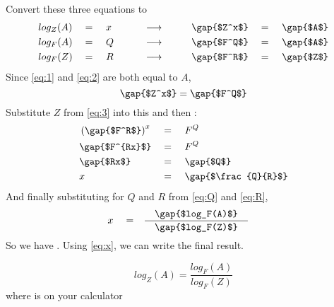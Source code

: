 \begin{NoHyper}
Convert these three equations to  
\begin{alignat}{7}
    & log_Z(A) && = &\,\,& x &\qquad& \longrightarrow &\qquad& \text{\gap{$Z^x$}} && = &\,\,& \text{\gap{$A$}} \label{eq:1}\\
    & log_F(A) && = && Q     &\qquad& \longrightarrow &\qquad& \text{\gap{$F^Q$}} && = &&     \text{\gap{$A$}} \label{eq:2}\\
    & log_F(Z) && = && R     &\qquad& \longrightarrow &\qquad& \text{\gap{$F^R$}} && = &&     \text{\gap{$Z$}} \label{eq:3}
\end{alignat}
Since \eqref{eq:1} and \eqref{eq:2} 
are both equal to $A$, 
\begin{equation}
    \text{\gap{$Z^x$}} = \text{\gap{$F^Q$}} 
\end{equation} 
Substitute $Z$ from \eqref{eq:3} into this
and then   :
\begin{alignat*}{3}
    & \left( \text{\gap{$F^R$}} \right)^x && = &\,\,& F^Q \\
    & \text{\gap{$F^{Rx}$}}               && = &&     F^Q \\
    & \text{\gap{$Rx$}}                   && = &&     \text{\gap{$Q$}}   \\
    & x                                   && = &&     \text{\gap{$\frac{Q}{R}$}}
\end{alignat*}
And finally substituting for $Q$ and $R$ from \eqref{eq:Q} and \eqref{eq:R},
\begin{alignat*}{3}
    & x && = && 
                \frac
                {\quad  \text{\gap{$log_F(A)$}}  \quad}
                {\quad  \text{\gap{$log_F(Z)$}}  \quad}
\end{alignat*}
%
So we have   . 
Using \eqref{eq:x}, we can write the final result.

\begin{tcolorbox}[center,width=3in,colback=white,title={\itshape Change of Base Formula},colbacktitle=white,coltitle=black]
    \[ 
        log_Z(A) = \frac {log_F(A)} {log_F(Z)}
    \]
    \centering 
    where  is on your calculator
\end{tcolorbox}



\end{NoHyper}
